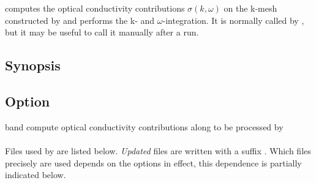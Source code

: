 
\womain computes the optical conductivity contributions $σ(k,ω)$ on
the k-mesh constructed by  and performs the k- and
$ω$-integration.  It is normally called by \woprog, but it may be
useful to call it manually after a \woprog run.

\subsection{Synopsis}
\begin{usage}
  \womain [\td{}band] \case
\end{usage}

\subsection{Option}
\begin{options}
\item [{\lvir[xshift=-2.65mm]}\td{}band] compute optical conductivity
  contributions along  to be processed by
  \kanalysis
\end{options}

\paragraph{} Files used by \womain are listed below.  \emph{Updated}
files are written with a suffix .  Which files precisely
are used depends on the options in effect, this dependence is
partially indicated below.

